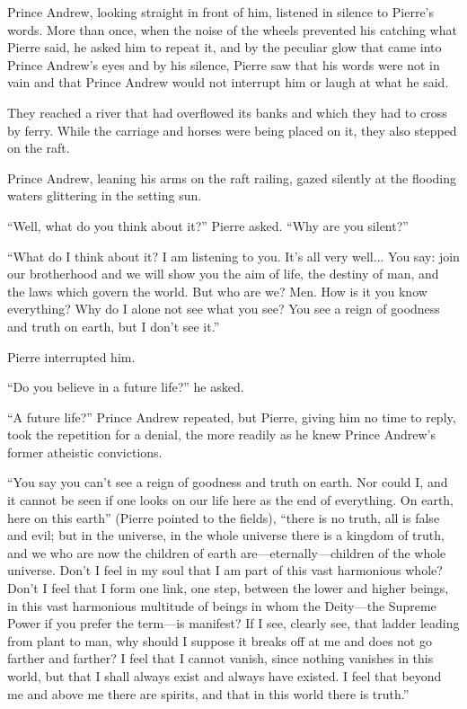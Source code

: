 Prince Andrew, looking straight in front of him, listened in
silence to Pierre's words. More than once, when the noise of the
wheels prevented his catching what Pierre said, he asked him to
repeat it, and by the peculiar glow that came into Prince
Andrew's eyes and by his silence, Pierre saw that his words were
not in vain and that Prince Andrew would not interrupt him or
laugh at what he said.

They reached a river that had overflowed its banks and which they
had to cross by ferry. While the carriage and horses were being
placed on it, they also stepped on the raft.

Prince Andrew, leaning his arms on the raft railing, gazed
silently at the flooding waters glittering in the setting sun.

``Well, what do you think about it?'' Pierre asked. ``Why are you
silent?''

``What do I think about it? I am listening to you. It's all very
well...  You say: join our brotherhood and we will show you the
aim of life, the destiny of man, and the laws which govern the
world. But who are we?  Men. How is it you know everything? Why
do I alone not see what you see?  You see a reign of goodness and
truth on earth, but I don't see it.''

Pierre interrupted him.

``Do you believe in a future life?'' he asked.

``A future life?'' Prince Andrew repeated, but Pierre, giving him
no time to reply, took the repetition for a denial, the more
readily as he knew Prince Andrew's former atheistic convictions.

``You say you can't see a reign of goodness and truth on
earth. Nor could I, and it cannot be seen if one looks on our
life here as the end of everything. On earth, here on this
earth'' (Pierre pointed to the fields), ``there is no truth, all
is false and evil; but in the universe, in the whole universe
there is a kingdom of truth, and we who are now the children of
earth are---eternally---children of the whole universe.  Don't I
feel in my soul that I am part of this vast harmonious whole?
Don't I feel that I form one link, one step, between the lower
and higher beings, in this vast harmonious multitude of beings in
whom the Deity---the Supreme Power if you prefer the term---is
manifest? If I see, clearly see, that ladder leading from plant
to man, why should I suppose it breaks off at me and does not go
farther and farther? I feel that I cannot vanish, since nothing
vanishes in this world, but that I shall always exist and always
have existed. I feel that beyond me and above me there are
spirits, and that in this world there is truth.''

